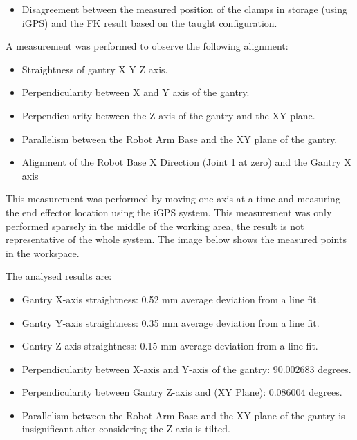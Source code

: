 {\begin{itemize}
	\item Disagreement between the measured position of the clamps in storage (using iGPS) and the FK result based on the taught configuration.

\end{itemize}
A measurement was performed to observe the following alignment:

\begin{itemize}
	\item Straightness of gantry X Y Z axis.

	\item Perpendicularity between X and Y axis of the gantry.

	\item Perpendicularity between the Z axis of the gantry and the XY plane.

	\item Parallelism between the Robot Arm Base and the XY plane of the gantry.

	\item Alignment of the Robot Base X Direction (Joint 1 at zero) and the Gantry X axis

\end{itemize}
This measurement was performed by moving one axis at a time and measuring the end effector location using the iGPS system. This measurement was only performed sparsely in the middle of the working area, the result is not representative of the whole system. The image below shows the measured points in the workspace.




The analysed results are:

\begin{itemize}
	\item Gantry X-axis straightness: 0.52 mm average deviation from a line fit.

	\item Gantry Y-axis straightness: 0.35 mm average deviation from a line fit.

	\item Gantry Z-axis straightness: 0.15 mm average deviation from a line fit.

	\item Perpendicularity between X-axis and Y-axis of the gantry: 90.002683 degrees.

	\item Perpendicularity between Gantry Z-axis and (XY Plane): 0.086004 degrees.

	\item Parallelism between the Robot Arm Base and the XY plane of the gantry is insignificant after considering the Z axis is tilted.


\end{itemize}}
